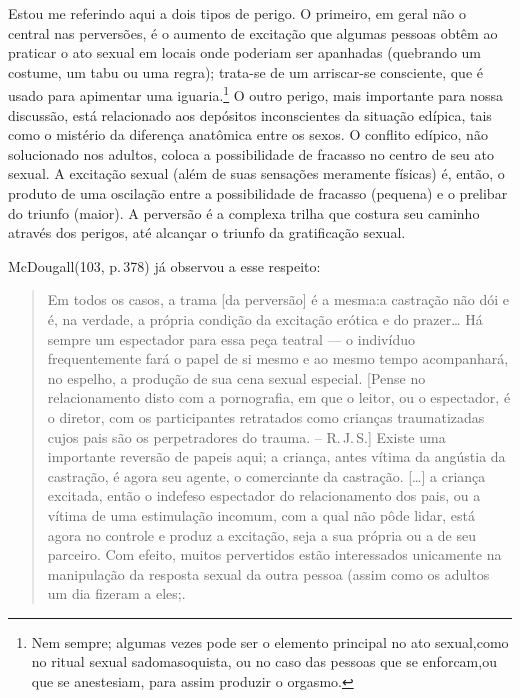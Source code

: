 Estou me referindo aqui a dois tipos de perigo. O primeiro, em
geral não o central nas perversões, é o aumento de excitação que
algumas pessoas obtêm ao praticar o ato sexual em locais onde poderiam
ser apanhadas (quebrando um costume, um tabu ou uma regra); trata-se
de um arriscar-se consciente,\idxperigocon{} que é usado para apimentar uma iguaria.\footnote{ Nem sempre;
algumas vezes pode ser o elemento principal no
ato sexual,\idxsadivoye[|nn] como no ritual sexual sadomasoquista, ou no caso das
pessoas que se enforcam,\idxenfor[|nn] ou que se anestesiam, para assim produzir o
orgasmo.} O outro perigo, mais importante para nossa discussão, está
relacionado aos depósitos inconscientes da situação edípica,\idxconfe{} tais como
o mistério da diferença anatômica entre os sexos. O conflito edípico,\idxperigocof{}
não solucionado nos adultos, coloca a possibilidade de fracasso no
centro de seu ato sexual. A excitação sexual (além de suas sensações
meramente físicas) é, então, o produto de uma oscilação entre a
possibilidade de fracasso (pequena) e o prelibar do triunfo (maior). A
perversão é a complexa trilha que costura seu caminho através dos
perigos, até alcançar o triunfo da gratificação sexual.


McDougall\idxmcdoug[|(] (103, p.\,378) já observou a esse respeito:

\begin{quote}
Em todos os casos, a trama [da perversão] é a mesma:\idxsexuecas[|(]
a castração\idxcastr{} não dói e é, na verdade, a própria condição da excitação
erótica e do prazer\ldots{} Há sempre um espectador para essa peça teatral
--- o indivíduo frequentemente fará o papel de si mesmo e ao
mesmo tempo acompanhará, no espelho, a produção de sua cena sexual
especial. [Pense no relacionamento disto com a pornografia, em que o
leitor, ou o espectador, é o diretor, com os participantes retratados
como crianças traumatizadas cujos pais são os perpetradores do trauma.
-- R.\,J.\,S.] Existe uma importante reversão de papeis aqui; a
criança, antes vítima da angústia da castração, é agora seu agente, o
comerciante da castração. [\ldots{}] a criança\idxsexueinf{} excitada,\idxinfanexcit{} então o indefeso
espectador do relacionamento dos pais, ou a vítima de uma estimulação
incomum, com a qual não pôde lidar, está agora no controle e produz a
excitação, seja a sua própria ou a de seu parceiro. Com efeito, muitos
pervertidos estão interessados unicamente na manipulação da resposta
sexual da outra pessoa (assim como os adultos um dia fizeram a eles;.\idxmcdoug[|)]
\end{quote}

